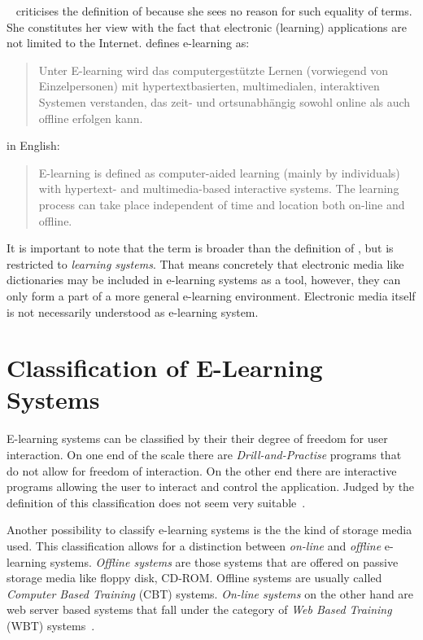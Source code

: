 ~\citeyear{Richert2007} criticises the definition of
 because she sees no reason for such equality
of terms. She constitutes her view with the fact that electronic (learning) 
applications are not limited to the Internet.  
\citeyear{Richert2007} defines e-learning as:
  \begin{quote}
    Unter E-learning wird das computergestützte Lernen (vorwiegend von 
    Einzelpersonen) mit hypertextbasierten, multimedialen, interaktiven 
    Systemen verstanden, das zeit- und ortsunabhängig sowohl online als 
    auch offline erfolgen kann.
  \end{quote}
in English:
  \begin{quote}
    E-learning is defined as computer-aided learning (mainly by individuals)
    with hypertext- and multimedia-based interactive systems. The learning
    process can take place independent of time and location both on-line and 
    offline.
  \end{quote}
It is important to note that the term is broader than the definition of
, but is restricted to \emph{learning systems}.
That means concretely that electronic media like dictionaries may be included
in e-learning systems as a tool, however, they can only form a part of a 
more general e-learning environment. Electronic media itself is not necessarily
understood as e-learning system.


\section{Classification of E-Learning Systems} %
\label{sec:elearn:classification}

E-learning systems can be classified by their their degree of freedom for 
user interaction. On one end of the scale there are \emph{Drill-and-Practise} 
programs that do not allow for freedom of interaction. On the other end there 
are interactive programs allowing the user to interact and control the 
application. Judged by the definition of  this 
classification does not seem very suitable~.

Another possibility to classify e-learning systems is the the kind of storage
media used. This classification allows for a distinction between \emph{on-line} 
and \emph{offline} e-learning systems. \emph{Offline systems} are those systems
that are offered on passive storage media like floppy disk, CD-ROM.
Offline systems are usually called \emph{Computer Based Training} (CBT) systems.
\emph{On-line systems} on the other hand are web server based systems that fall
under the category of \emph{Web Based Training} (WBT) 
systems~.

